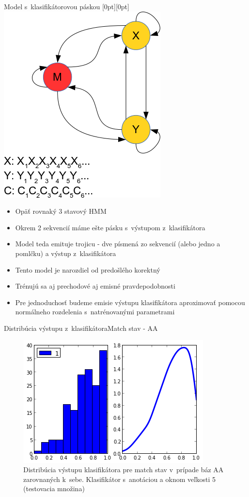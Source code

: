 \documentclass[xcolor=dvipsnames, compress, 12pt, t]{beamer}
\newcommand{\lenitem}[2][.6\linewidth]{\parbox[t]{#1}{\strut #2\strut}}
\begin{document}
\begin{frame}{Model s~klasifikátorovou páskou}
  \mbox{}\hfill\raisebox{-\height}[0pt][0pt]{
   \includegraphics[width=.30\textwidth]{images/model_clf_paska}
   }
  \vspace*{-\baselineskip}
  \begin{itemize}
    \item \lenitem{Opäť rovnaký 3 stavový HMM}
    \item \lenitem{Okrem 2 sekvencií máme ešte pásku s~výstupom z~klasifikátora}
    \item \lenitem{Model teda emituje trojicu - dve písmená zo sekvencií (alebo jedno a pomlčku) a výstup z~klasifikátora}
    \pause
    \item \lenitem{Tento model je narozdiel od predošlého korektný}
    \item \lenitem{Trénujú sa aj prechodové aj emisné pravdepodobnosti}
    \item Pre jednoduchosť budeme emisie výstupu klasifikátora aproximovať pomocou normálneho rozdelenia s~natrénovanými parametrami
  \end{itemize}
\end{frame}

\begin{frame}{Distribúcia výstupu z~klasifikátora}{Match stav - AA}
\begin{figure}[hbtp]
    \centering
    \includegraphics[height=0.55\textheight]{images/distr_aa.png}
    \caption{Distribúcia výstupu klasifikátora pre match stav v~prípade báz AA zarovnaných k~sebe. Klasifikátor s~anotáciou a oknom veľkosti 5 (testovacia množina)}
\end{figure}
\end{frame}
\end{document}
